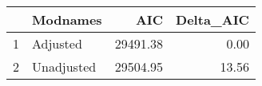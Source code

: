 \begin{table}[ht]
\centering
\begin{tabular}{rlrr}
  \hline
 & Modnames & AIC & Delta\_AIC \\ 
  \hline
1 & Adjusted & 29491.38 & 0.00 \\ 
  2 & Unadjusted & 29504.95 & 13.56 \\ 
   \hline
\end{tabular}
\end{table}

